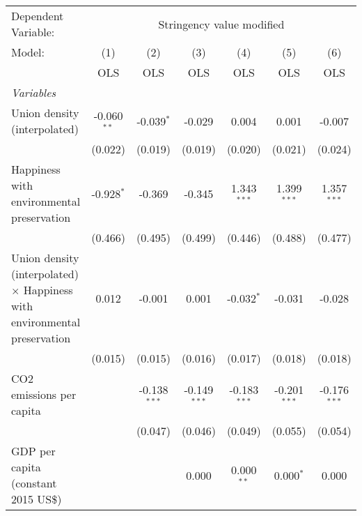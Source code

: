 
\begingroup
\centering
\begin{tabular}{lcccccc}
   \toprule
   Dependent Variable: & \multicolumn{6}{c}{Stringency value modified}\\
   Model:                                                                           & (1)           & (2)            & (3)            & (4)            & (5)            & (6)\\  
                                                                                    &  OLS          & OLS            & OLS            & OLS            & OLS            & OLS\\  
   \midrule
   \emph{Variables}\\
   Union density (interpolated)                                                     & -0.060$^{**}$ & -0.039$^{*}$   & -0.029         & 0.004          & 0.001          & -0.007\\   
                                                                                    & (0.022)       & (0.019)        & (0.019)        & (0.020)        & (0.021)        & (0.024)\\   
   Happiness with environmental preservation                                        & -0.928$^{*}$  & -0.369         & -0.345         & 1.343$^{***}$  & 1.399$^{***}$  & 1.357$^{***}$\\   
                                                                                    & (0.466)       & (0.495)        & (0.499)        & (0.446)        & (0.488)        & (0.477)\\   
   Union density (interpolated) $\times$ Happiness with environmental preservation  & 0.012         & -0.001         & 0.001          & -0.032$^{*}$   & -0.031         & -0.028\\   
                                                                                    & (0.015)       & (0.015)        & (0.016)        & (0.017)        & (0.018)        & (0.018)\\   
   CO2 emissions per capita                                                         &               & -0.138$^{***}$ & -0.149$^{***}$ & -0.183$^{***}$ & -0.201$^{***}$ & -0.176$^{***}$\\   
                                                                                    &               & (0.047)        & (0.046)        & (0.049)        & (0.055)        & (0.054)\\   
   GDP per capita (constant 2015 US\$)                                              &               &                & 0.000          & 0.000$^{**}$   & 0.000$^{*}$    & 0.000\\   

\end{tabular}
